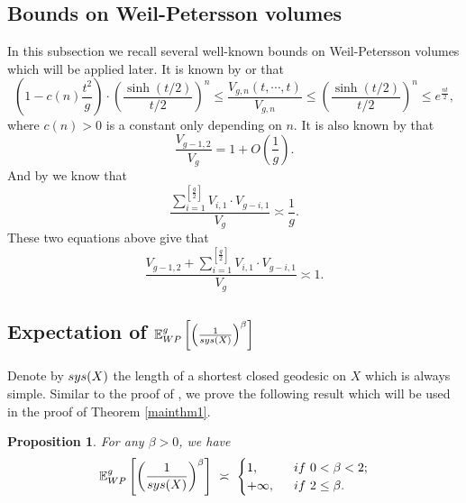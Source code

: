 \documentclass[11pt]{amsart}
\newcommand{\E}{\mathbb{E}_{\rm WP}^g}
\def\sys{\mathop{\rm sys}}
\theoremstyle{plain}
\newtheorem{proposition}[theorem]{Proposition}
\newcommand{\be}{\begin{equation}}
\newcommand{\ene}{\end{equation}}
\theoremstyle{definition}
\theoremstyle{remark}
\begin{document}
\subsection{Bounds on Weil-Petersson volumes}
In this subsection we recall several well-known bounds on Weil-Petersson volumes which will be applied later. It is known by \cite[Lemma 22]{nie2023large} or \cite[Proposition 3.1]{MP19} that
\be\label{b-v-1}
\left(1- c(n) \frac{t^2}{g}\right)\cdot \left(\frac{\sinh(t/2)}{t/2} \right)^n\leq \frac{V_{g,n}(t,\cdots,t)}{V_{g,n}}\leq \left(\frac{\sinh(t/2)}{t/2} \right)^n\leq e^{\frac{nt}{2}},
\ene
where $c(n)>0$ is a constant only depending on $n$. It is also known by \cite[Part (3) of Theorem 3.5]{mirzakhani2013growth} that
\[\frac{V_{g-1,2}}{V_g}=1+O\left(\frac{1}{g}\right).\]
And by \cite[Lemma 3.3]{mirzakhani2013growth} we know that
\[\frac{\sum\limits_{i=1}^{\left[\frac{g}{2}\right]}V_{i,1}\cdot V_{g-i,1}}{V_g}\asymp \frac{1}{g}.\]
These two equations above give that
\be\label{b-v-2}
\frac{V_{g-1,2}+\sum\limits_{i=1}^{\left[\frac{g}{2}\right]}V_{i,1}\cdot V_{g-i,1}}{V_g}\asymp 1.
\ene



\subsection{Expectation of $\E\left[ 
  \left( \frac{1}{\sys(X)} \right)^\beta\right]$ }
Denote by $\sys(X)$ the length of a shortest closed geodesic on $X$ which is always simple.
Similar to the proof of \cite[Corollary 4.3]{mirzakhani2013growth}, we prove the following result which will be used in the proof of Theorem \ref{mainthm1}.
\begin{proposition}\label{sysbetacritical}
 For any $\beta>0$, we have
\be
\E\left[ 
  \left( \frac{1}{\sys(X)} \right)^\beta\right] \ \asymp \ \nonumber
\begin{cases}
1,\ &\ \textit{\emph{if}}\  0<\beta<2; \\
+\infty, \ &\ \textit{\emph{if}}\  2\leq \beta. 
\end{cases}
\ene
\end{proposition}
\end{document}
